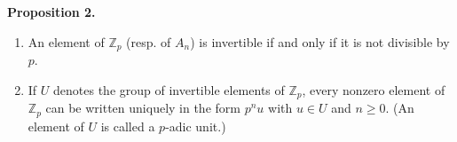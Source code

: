 \textbf{Proposition 2.}
\begin{enumerate}
\item[(a)] An element of $\mathbb{Z}_p$ (resp. of $A_n$) is invertible if and only if it is not divisible by $p$.
\item[(b)] If $U$ denotes the group of invertible elements of $\mathbb{Z}_p$, every nonzero element of $\mathbb{Z}_p$ can be written uniquely in the form $p^n u$ with $u \in U$ and $n \geq 0$. (An element of $U$ is called a $p$-adic unit.)
\end{enumerate}
